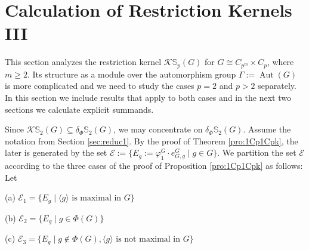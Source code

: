 \documentclass[12pt]{article}
\theoremstyle{plain}
\theoremstyle{definition}
\newcommand{\kerlin}{\mathbb S_p}
\newcommand{\kerlint}{\mathbb S_2}
\newcommand{\Aut}{\operatorname{Aut}}
\begin{document}
\section{Calculation of Restriction Kernels III}\label{sec:restkerGen}

This section analyzes the restriction kernel \( \mathcal{K}\kerlin(G) \) for \( G \cong C_{p^m} \times C_p \), where \( m \geq 2 \). Its structure as a module over the automorphism group $\Gamma:= \Aut(G)$ is more complicated and we need to study the cases $p=2$ and $p>2$ separately. In this section we include results that apply to both cases and in the next two sections we calculate explicit summands. 

Since $\mathcal K\kerlint(G)\subseteq \delta_\Phi\kerlint(G)$, we may concentrate on $\delta_\Phi\kerlint(G)$. Assume the notation from Section \ref{sec:reduc1}.
By the proof of Theorem \ref{pro:1Cp1Cpk}, the later is generated by the set $\mathcal E:=\{ E_g:= \varphi_1^G\cdot e_{G, g}^G\mid g\in G\}$. We partition the set $\mathcal E$ according to the three cases of the proof of Proposition \ref{pro:1Cp1Cpk} as follows: Let

\smallskip
{\rm (a)} $\mathcal E_1 = \big\{ E_g \mid \langle g\rangle \text{ is maximal in } G \big\}$

\smallskip
{\rm (b)} $\mathcal E_2 = \big\{ E_g \mid g\in\Phi(G) \big\}$

\smallskip
{\rm (c)} $\mathcal E_3 = \big\{ E_g \mid g\not\in\Phi(G), \langle g\rangle \text{ is not maximal in } G \big\}$
\end{document}
